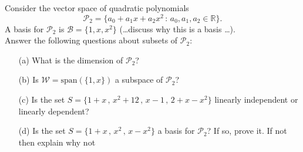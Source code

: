 \begin{problem}
    Consider the vector space of quadratic polynomials 
    \[ \mathcal{P}_2 = \{ a_0 + a_1 x + a_2 x^2 \, : \, a_0, a_1, a_2 \in \mathbb{R} \}. \]
    A basis for $\mathcal{P}_2$ is $\mathcal{B} = \{1,x,x^2\}$ (\dots discuss why this is a basis
    \dots).\\
    Answer the following questions about subsets of $\mathcal{P}_2$:
    \begin{enumerate}
        \item[(a)] What is the dimension of $\mathcal{P}_2$?
        \item[(b)] Is $\mathcal{W} = \text{span}(\{1,x\})$ a subspace of $\mathcal{P}_2$?
        \item[(c)] Is the set $S = \{ 1+x\,,\,x^2+12\,,\,x-1\,,\,2+x-x^2\}$ linearly
            independent or linearly dependent?
        \item[(d)] Is the set $S = \{1+x \,,\, x^2\,,\, x-x^2\}$ a basis for
            $\mathcal{P}_2$?  If so, prove it.  If not then explain why not
    \end{enumerate}
\end{problem}


